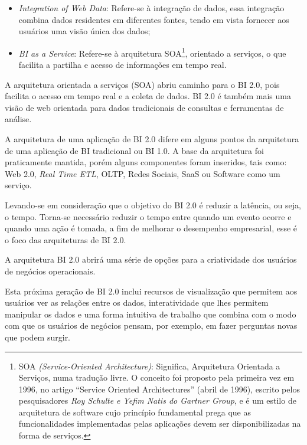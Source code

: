\begin{itemize}
    \item \textit{Integration of Web Data}: Refere-se \`{a} integra\c{c}\~{a}o de dados, essa integra\c{c}\~{a}o combina dados residentes em diferentes fontes, tendo em vista fornecer aos usu\'{a}rios uma vis\~{a}o única dos dados;
    
    \item \textit{BI as a Service}: Refere-se \`{a} arquitetura SOA\footnote{SOA \textit{(Service-Oriented Architecture)}: Significa, Arquitetura Orientada a Servi\c{c}os, numa tradu\c{c}\~{a}o livre. O conceito foi proposto pela primeira vez em 1996, no artigo “Service Oriented Architectures” (abril de 1996), escrito pelos pesquisadores \textit{Roy Schulte e Yefim Natis do Gartner Group}, e \'{e} um estilo de arquitetura de software cujo princ\'{i}pio fundamental prega que as funcionalidades implementadas pelas aplica\c{c}\~{o}es devem ser disponibilizadas na forma de servi\c{c}os.}, orientado a servi\c{c}os, o que facilita a partilha e acesso de informa\c{c}\~{o}es em tempo real.

\end{itemize}

A arquitetura orientada a servi\c{c}os (SOA) abriu caminho para o BI 2.0, pois facilita o acesso em tempo real e a coleta de dados. BI 2.0 \'{e} tamb\'{e}m mais uma vis\~{a}o de web orientada para dados tradicionais de consultas e ferramentas de an\'{a}lise.

A arquitetura de uma aplica\c{c}\~{a}o de BI 2.0 difere em alguns pontos da arquitetura de uma aplica\c{c}\~{a}o de BI tradicional ou BI 1.0. A base da arquitetura foi praticamente mantida, por\'{e}m alguns componentes foram inseridos, tais como: Web 2.0, \textit{Real Time ETL}, OLTP, Redes Sociais, SaaS ou Software como um servi\c{c}o.

Levando-se em considera\c{c}\~{a}o que o objetivo do BI 2.0 \'{e} reduzir a lat\^{e}ncia, ou seja, o tempo. Torna-se necess\'{a}rio reduzir o tempo entre quando um evento ocorre e quando uma a\c{c}\~{a}o \'{e} tomada, a fim de melhorar o desempenho empresarial, esse \'{e} o foco das arquiteturas de BI 2.0. 

A arquitetura BI 2.0 abrir\'{a} uma s\'{e}rie de op\c{c}\~{o}es para a criatividade dos usu\'{a}rios de neg\'{o}cios operacionais. 

Esta pr\'{o}xima gera\c{c}\~{a}o de BI 2.0 inclui recursos de visualiza\c{c}\~{a}o que permitem aos usu\'{a}rios ver as rela\c{c}\~{o}es entre os dados, interatividade que lhes permitem manipular os dados e uma forma intuitiva de trabalho que combina com o modo com que os usu\'{a}rios de neg\'{o}cios pensam, por exemplo, em fazer perguntas novas que podem surgir. 

